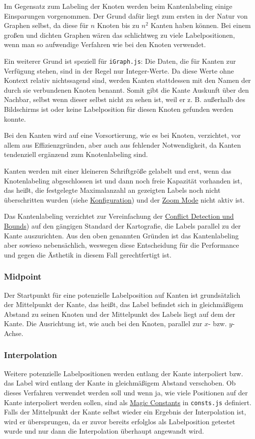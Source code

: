Im Gegensatz zum Labeling der Knoten werden beim Kantenlabeling einige Einsparungen vorgenommen.
Der Grund dafür liegt zum ersten in der Natur von Graphen selbst, da diese für $n$ Knoten bis zu $n^2$ Kanten haben können.
Bei einem großen und dichten Graphen wären das schlichtweg zu viele Labelpositionen, wenn man so aufwendige Verfahren wie bei den Knoten verwendet.

Ein weiterer Grund ist speziell für \texttt{iGraph.js}: Die Daten, die für Kanten zur Verfügung stehen, sind in der Regel nur Integer-Werte.
Da diese Werte ohne Kontext relativ nichtssagend sind, werden Kanten stattdessen mit den Namen der durch sie verbundenen Knoten benannt.
Somit gibt die Kante Auskunft über den Nachbar, selbst wenn dieser selbst nicht zu sehen ist, weil er z. B. außerhalb des Bildschirms ist oder
keine Labelposition für diesen Knoten gefunden werden konnte.

Bei den Kanten wird auf eine Vorsortierung, wie es bei Knoten, verzichtet, vor allem aus Effizienzgründen, aber auch aus fehlender Notwendigkeit, da Kanten tendenziell ergänzend zum Knotenlabeling sind.

Kanten werden mit einer kleineren Schriftgröße gelabelt und erst, wenn das Knotenlabeling abgeschlossen ist und dann noch freie Kapazität vorhanden ist,
das heißt, die festgelegte Maximalanzahl an gezeigten Labels noch nicht überschritten wurden (siehe \hyperref[sec:configuration]{Konfiguration})
und der \hyperref[subsec:zoom]{Zoom Mode} nicht aktiv ist.

Das Kantenlabeling verzichtet zur Vereinfachung der \hyperref[sec:conflict]{Conflict Detection und Bounds}) auf den gängigen Standard der Kartografie, die Labels
parallel zu der Kante auszurichten.
Aus den oben genannten Gründen ist das Kantenlabeling aber sowieso nebensächlich, weswegen diese Entscheidung für die Performance
und gegen die Ästhetik in diesem Fall gerechtfertigt ist.

\subsubsection{Midpoint}
Der Startpunkt für eine potenzielle Labelposition auf Kanten ist grundsätzlich der Mittelpunkt der Kante, das heißt, das Label befindet sich in
gleichmäßigem Abstand zu seinen Knoten und der Mittelpunkt des Labels liegt auf dem der Kante. Die Ausrichtung ist, wie auch bei den Knoten, parallel zur $x$- bzw. $y$-Achse.

\subsubsection{Interpolation}
Weitere potenzielle Labelpositionen werden entlang der Kante interpoliert bzw. das Label wird entlang der Kante in gleichmäßigem Abstand verschoben.
Ob dieses Verfahren verwendet werden soll und wenn ja, wie viele Positionen auf der Kante interpoliert werden sollen, sind als \hyperref[subsec:consts]{Magic Constants} in \texttt{consts.js} definiert.
Falls der Mittelpunkt der Kante selbst wieder ein Ergebnis der Interpolation ist, wird er übersprungen, da er zuvor bereits erfolglos als Labelposition getestet wurde und nur dann die Interpolation überhaupt angewandt wird.